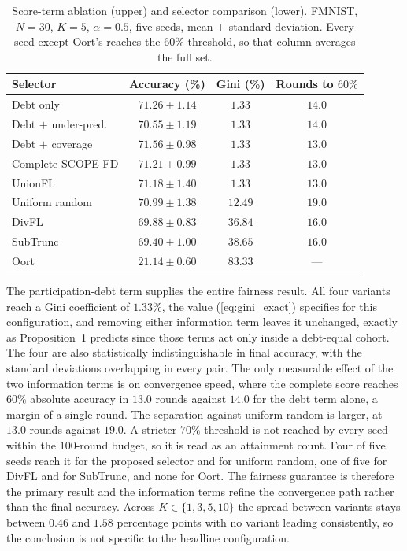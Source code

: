 \documentclass[journal]{IEEEtran}
\newcommand{\rev}[1]{{\color{blue}#1}}
\begin{document}
\begin{table}[t]
\centering
\caption{\rev{Score-term ablation (upper) and selector comparison (lower). FMNIST, $N=30$, $K=5$, $\alpha=0.5$, five seeds, mean $\pm$ standard deviation. Every seed except Oort's reaches the $60\%$ threshold, so that column averages the full set.}}
\label{tab:headline}
\renewcommand{\arraystretch}{1.15}
\footnotesize
\setlength{\tabcolsep}{4pt}
\begin{tabular}{@{}lccc@{}}
\toprule
\textbf{Selector} & \textbf{Accuracy (\%)} & \textbf{Gini (\%)} & \textbf{Rounds to $60\%$} \\
\midrule
Debt only              & $71.26 \pm 1.14$ & $1.33$  & $14.0$ \\
Debt $+$ under-pred.   & $70.55 \pm 1.19$ & $1.33$  & $14.0$ \\
Debt $+$ coverage      & $71.56 \pm 0.98$ & $1.33$  & $13.0$ \\
Complete SCOPE-FD      & $71.21 \pm 0.99$ & $1.33$  & $13.0$ \\
\midrule
UnionFL \cite{castillo2024unionfl}  & $71.18 \pm 1.40$ & $1.33$  & $13.0$ \\
Uniform random      & $70.99 \pm 1.38$ & $12.49$ & $19.0$ \\
DivFL \cite{balakrishnan2022divfl}   & $69.88 \pm 0.83$ & $36.84$ & $16.0$ \\
SubTrunc \cite{castillo2024subtrunc} & $69.40 \pm 1.00$ & $38.65$ & $16.0$ \\
Oort \cite{lai2021oort}              & $21.14 \pm 0.60$ & $83.33$ & --- \\
\bottomrule
\end{tabular}
\end{table}

\rev{The participation-debt term supplies the entire fairness result. All four variants reach a Gini coefficient of $1.33\%$, the value (\ref{eq:gini_exact}) specifies for this configuration, and removing either information term leaves it unchanged, exactly as Proposition~1 predicts since those terms act only inside a debt-equal cohort. The four are also statistically indistinguishable in final accuracy, with the standard deviations overlapping in every pair. The only measurable effect of the two information terms is on convergence speed, where the complete score reaches $60\%$ absolute accuracy in $13.0$ rounds against $14.0$ for the debt term alone, a margin of a single round. The separation against uniform random is larger, at $13.0$ rounds against $19.0$. A stricter $70\%$ threshold is not reached by every seed within the $100$-round budget, so it is read as an attainment count. Four of five seeds reach it for the proposed selector and for uniform random, one of five for DivFL and for SubTrunc, and none for Oort. The fairness guarantee is therefore the primary result and the information terms refine the convergence path rather than the final accuracy. Across $K \in \{1, 3, 5, 10\}$ the spread between variants stays between $0.46$ and $1.58$ percentage points with no variant leading consistently, so the conclusion is not specific to the headline configuration.}
\end{document}
